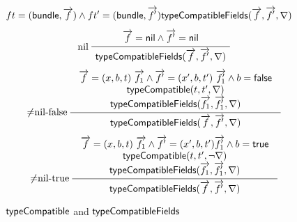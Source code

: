 {\begin{figure}[htbp]
\begin{gather*}
		{
			\seqq{ft = (\btype, \myvec{f}) \wedge ft' = (\btype, \myvec{f'})} 
		}
		{
			\seqq{\typecompatiblefields(\myvec{f}, \myvec{f'}, \flipped)}
		}
		\quad
		\\[1ex]
		\infer[nil]
		{\typecompatiblefields(\myvec{f}, \myvec{f'}, \flipped)}
		{
			\begin{array}{c}
				\myvec{f} = \nil \wedge \myvec{f'} = \nil
			\end{array}
		}
		\\[1ex]
		\infer[$\neq$nil-false]
		{\typecompatiblefields(\myvec{f}, \myvec{f'}, \flipped)}
		{
			\begin{array}{c}
				\myvec{f} = (x, b, t)\ \myvec{f_1} \wedge \myvec{f'} = (x', b, t')\ \myvec{f'_1} \wedge b = \lfalse \\
				\typecompatible(t, t', \flipped) \\
				\typecompatiblefields(\myvec{f_1}, \myvec{f'_1}, \flipped)
			\end{array}
		}
		\\[1ex]
		\infer[$\neq$nil-true]
		{\typecompatiblefields(\myvec{f}, \myvec{f'}, \flipped)}
		{
			\begin{array}{c}
				\myvec{f} = (x, b, t)\ \myvec{f_1} \wedge \myvec{f'} = (x', b, t') \myvec{f'_1} \wedge b = \ltrue \\
				\typecompatible(t, t', \neg \flipped) \\
				\typecompatiblefields(\myvec{f_1}, \myvec{f'_1}, \flipped)
			\end{array}
		}
	\end{gather*}
	\caption{${\sf typeCompatible}$ and ${\sf typeCompatibleFields}$}
	\label{fig:type-compatible}
\end{figure}
}

